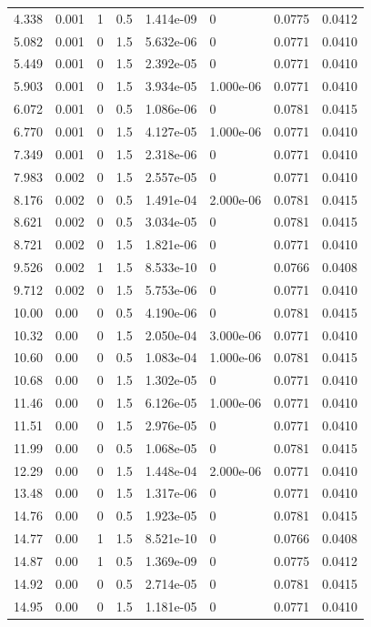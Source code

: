 \documentclass[preview]{standalone}
\begin{document}
{{\begin{tabular}{L{1.2cm}C{1.2cm} C{0.3cm}C{0.5cm} C{1.4cm}C{1.4cm} C{1.4cm}C{1.4cm}}
  4.338  &  0.001  & 1     & 0.5 &  1.414e-09  & 0  & 0.0775 &  0.0412   \\ 
  5.082  &  0.001  & 0     & 1.5 &  5.632e-06  & 0  & 0.0771 &  0.0410   \\ 
  5.449  &  0.001  & 0     & 1.5 &  2.392e-05  & 0  & 0.0771 &  0.0410   \\ 
  5.903  &  0.001  & 0     & 1.5 &  3.934e-05  & 1.000e-06  & 0.0771 &  0.0410   \\ 
  6.072  &  0.001  & 0     & 0.5 &  1.086e-06  & 0  & 0.0781 &  0.0415   \\ 
  6.770  &  0.001  & 0     & 1.5 &  4.127e-05  & 1.000e-06  & 0.0771 &  0.0410   \\ 
  7.349  &  0.001  & 0     & 1.5 &  2.318e-06  & 0  & 0.0771 &  0.0410   \\ 
  7.983  &  0.002  & 0     & 1.5 &  2.557e-05  & 0  & 0.0771 &  0.0410   \\ 
  8.176  &  0.002  & 0     & 0.5 &  1.491e-04  & 2.000e-06  & 0.0781 &  0.0415   \\ 
  8.621  &  0.002  & 0     & 0.5 &  3.034e-05  & 0  & 0.0781 &  0.0415   \\ 
  8.721  &  0.002  & 0     & 1.5 &  1.821e-06  & 0  & 0.0771 &  0.0410   \\ 
  9.526  &  0.002  & 1     & 1.5 &  8.533e-10  & 0  & 0.0766 &  0.0408   \\ 
  9.712  &  0.002  & 0     & 1.5 &  5.753e-06  & 0  & 0.0771 &  0.0410   \\ 
  10.00  &  0.00  & 0     & 0.5 &  4.190e-06  & 0  & 0.0781 &  0.0415   \\ 
  10.32  &  0.00  & 0     & 1.5 &  2.050e-04  & 3.000e-06  & 0.0771 &  0.0410   \\ 
  10.60  &  0.00  & 0     & 0.5 &  1.083e-04  & 1.000e-06  & 0.0781 &  0.0415   \\ 
  10.68  &  0.00  & 0     & 1.5 &  1.302e-05  & 0  & 0.0771 &  0.0410   \\ 
  11.46  &  0.00  & 0     & 1.5 &  6.126e-05  & 1.000e-06  & 0.0771 &  0.0410   \\ 
  11.51  &  0.00  & 0     & 1.5 &  2.976e-05  & 0  & 0.0771 &  0.0410   \\ 
  11.99  &  0.00  & 0     & 0.5 &  1.068e-05  & 0  & 0.0781 &  0.0415   \\ 
  12.29  &  0.00  & 0     & 1.5 &  1.448e-04  & 2.000e-06  & 0.0771 &  0.0410   \\ 
  13.48  &  0.00  & 0     & 1.5 &  1.317e-06  & 0  & 0.0771 &  0.0410   \\ 
  14.76  &  0.00  & 0     & 0.5 &  1.923e-05  & 0  & 0.0781 &  0.0415   \\ 
  14.77  &  0.00  & 1     & 1.5 &  8.521e-10  & 0  & 0.0766 &  0.0408   \\ 
  14.87  &  0.00  & 1     & 0.5 &  1.369e-09  & 0  & 0.0775 &  0.0412   \\ 
  14.92  &  0.00  & 0     & 0.5 &  2.714e-05  & 0  & 0.0781 &  0.0415   \\ 
  14.95  &  0.00  & 0     & 1.5 &  1.181e-05  & 0  & 0.0771 &  0.0410   \\ 
\hline 
\end{tabular} 

}}
\end{document}
